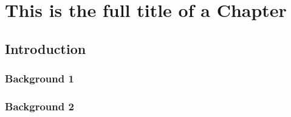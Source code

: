 \documentclass[letterpaper, 12pt, oneside]{book}
\theoremstyle{plain}
\theoremstyle{definition}
\theoremstyle{remark}
\begin{document}
\newpage
\quad \vspace{-1in} %
\listoffigures

\newpage
\quad \vspace{-1in} %
\listoftables




\newpage
{}



\chapter[Short Chapter Title]{This is the full title of a Chapter}
\label{chap:chapter1}

\section{Introduction} %
\label{sec:introduction}

\subsection{Background 1} %
\label{sub:background_1}


\subsection{Background 2} %
\label{sub:background_2}





\renewcommand\bibname{References}


% 
% 
\end{document}
